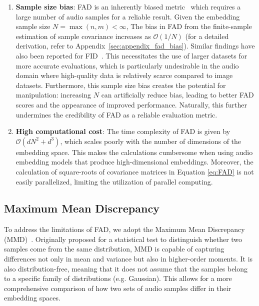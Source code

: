\begin{enumerate}
\item\textbf{Sample size bias}: FAD is an inherently biased metric~\cite{gui2024adapting} which requires a large number of audio samples for a reliable result. Given the embedding sample size $N =\max(n,m)<\infty$, 
The bias in FAD from the finite-sample estimation of sample covariance increases as $\mathcal{O}(1/N)$ (for a detailed derivation, refer to Appendix~\ref{sec:appendix_fad_bias}). Similar findings have also been reported for FID~\cite{chong2020effectively}.
This necessitates the use of larger datasets for more accurate evaluations, which is particularly undesirable in the audio domain where high-quality data is relatively scarce compared to image datasets. Furthermore, this sample size bias creates the potential for manipulation: increasing $N$ can artificially reduce bias, leading to better FAD scores and the appearance of improved performance. Naturally, this further undermines the credibility of FAD as a reliable evaluation metric.

\item\textbf{High computational cost}: 
The time complexity of FAD is given by $\mathcal{O}(dN^2+d^3)$, which scales poorly with the number of dimensions of the embedding space. This makes the calculations cumbersome when using audio embedding models that produce high-dimensional embeddings. Moreover, the calculation of square-roots of covariance matrices in Equation \ref{eq:FAD} is not easily parallelized, limiting the utilization of parallel computing.


\end{enumerate}


\subsection{Maximum Mean Discrepancy} 
\label{sec:mmd}

To address the limitations of FAD, we adopt the Maximum Mean Discrepancy (MMD)~\cite{grettonmmd}. Originally proposed for a statistical test to distinguish whether two samples come from the same distribution, MMD is capable of capturing differences not only in mean and variance but also in higher-order moments. It is also distribution-free, meaning that it does not assume that the samples belong to a specific family of distributions (e.g. Gaussian). This allows for a more comprehensive comparison of how two sets of audio samples differ in their embedding spaces.

